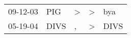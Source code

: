 \begin{supertabular}{p{0.07\textwidth}p{0.06\textwidth}p{0.02\textwidth}p{0.02\textwidth}p{0.06\textwidth}}
 09-12-03\textsuperscript{} &   PIG\textsuperscript{} &  \textgreater &  \textgreater &   bya\textsuperscript{} \\
 05-19-04\textsuperscript{} &  DIVS\textsuperscript{} &             , &  \textgreater &  DIVS\textsuperscript{} \\
\end{supertabular}
